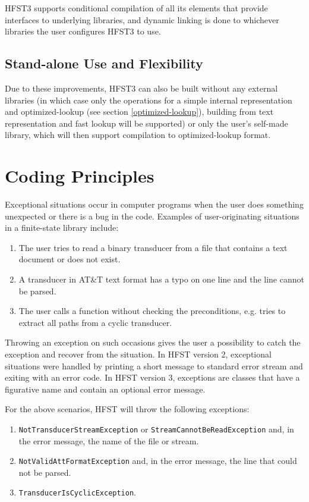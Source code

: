 \documentclass{llncs}
\begin{document}
HFST3 supports conditional compilation of all its elements that provide
interfaces to underlying libraries, and dynamic linking is done to whichever
libraries the user configures HFST3 to use.

\subsection{Stand-alone Use and Flexibility}
Due to these improvements, HFST3 can also be built without any external
libraries (in which case only the operations for a simple internal
representation and optimized-lookup (see section \ref{optimized-lookup}),
building from text representation and fast lookup will be supported) or only
the user's self-made library, which will then support compilation to
optimized-lookup format.

\section{Coding Principles}

Exceptional situations occur in computer programs when the
user does something unexpected or there is a bug in the code.
Examples of user-originating situations in a finite-state library include:

\begin{enumerate} 
\item The user tries to read a binary transducer from a
file that contains a text document or does not exist.
\item A transducer in AT\&T text format has a typo on one line and the 
line cannot be parsed. 
\item The user calls a function without checking the preconditions,
e.g. tries to extract all paths from a cyclic transducer.
\end{enumerate}

Throwing an exception on such occasions gives the user a possibility
to catch the exception and recover from the situation. In HFST version
2, exceptional situations were handled by printing a short message
to standard error stream and exiting with an error code. In HFST version 3, 
exceptions are classes that have a figurative name and contain an 
optional error message.

For the above scenarios, HFST will throw the following exceptions:

\begin{enumerate} 
\item \texttt{NotTransducerStreamException} or 
\texttt{StreamCannotBeReadException} and, in the error message,
the name of the file or stream.
\item \texttt{NotValidAttFormatException} and, in the error message, 
the line that could not be parsed.
\item \texttt{TransducerIsCyclicException}.
\end{enumerate} 
\end{document}
